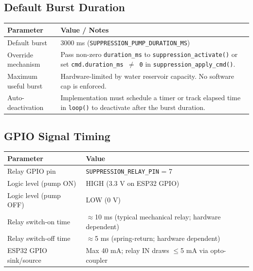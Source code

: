 \documentclass[12pt]{article}
\begin{document}
\subsection{Default Burst Duration}

\begin{table}[H]
\centering\small
\begin{tabularx}{\textwidth}{L{5cm} X}
\toprule
\textbf{Parameter} & \textbf{Value / Notes} \\
\midrule
Default burst & 3000 ms (\texttt{SUPPRESSION\_PUMP\_DURATION\_MS}) \\
Override mechanism & Pass non-zero \texttt{duration\_ms} to \texttt{suppression\_activate()} or set \texttt{cmd.duration\_ms $\neq$ 0} in \texttt{suppression\_apply\_cmd()}. \\
Maximum useful burst & Hardware-limited by water reservoir capacity. No software cap is enforced. \\
Auto-deactivation & Implementation must schedule a timer or track elapsed time in \texttt{loop()} to deactivate after the burst duration. \\
\bottomrule
\end{tabularx}
\end{table}

\subsection{GPIO Signal Timing}

\begin{table}[H]
\centering\small
\begin{tabularx}{\textwidth}{L{5cm} X}
\toprule
\textbf{Parameter} & \textbf{Value} \\
\midrule
Relay GPIO pin & \texttt{SUPPRESSION\_RELAY\_PIN} = 7 \\
Logic level (pump ON) & HIGH (3.3 V on ESP32 GPIO) \\
Logic level (pump OFF) & LOW (0 V) \\
Relay switch-on time & $\approx$10 ms (typical mechanical relay; hardware dependent) \\
Relay switch-off time & $\approx$5 ms (spring-return; hardware dependent) \\
ESP32 GPIO sink/source & Max 40 mA; relay IN draws $\leq$5 mA via opto-coupler \\
\bottomrule
\end{tabularx}
\end{table}

\end{document}

